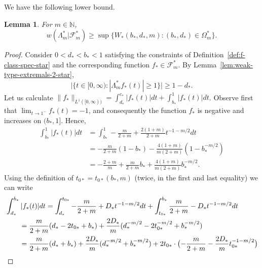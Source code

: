 \documentclass[a4paper]{amsart} %
\newtheorem{lemma}[theorem]{Lemma}
\theoremstyle{definition}
\theoremstyle{remark}
\numberwithin{equation}{section}
\newcommand*{\NNone}{\mathbb{N}}
\newcommand*{\weakconstrestricted}[2]{w(#1|#2)} %
\newcommand*{\fclassspecStar}[1]{\mathcal{F}_{#1}^*}
\newcommand*{\fStar}{f_{*}}
\newcommand*{\bStar}{b_*}
\newcommand*{\cStar}{c_*}
\newcommand*{\dStar}{d_*}
\newcommand*{\dOneStar}{D_*}%
\newcommand*{\tZeroStar}{t_{0*}}
\newcommand*{\specialbdStar}[1]{\Omega_{#1}^*}
\newcommand*{\XXXspecialbdStar}{W_*}
\begin{document}
We have the following lower bound.


\begin{lemma}
    \label{lem:lower-bound-fixed-m-special-b-c-d-alternate-expression-with-inequality-star}
	For $m\in\NNone$,
	\begin{equation*}
	\weakconstrestricted{\Lambda_m^*}{\fclassspecStar{m}} 
	\geq 
	\sup\bigl\{
	\XXXspecialbdStar(\bStar,\dStar,m) : (\bStar,\dStar)\in\specialbdStar{m} \bigr\}.
	\end{equation*}
\end{lemma}




\begin{proof}
	Consider $0< \dStar < \bStar < 1$ satisfying the constraints of  Definition~\ref{def:f-class-spec-star}
	and the corresponding function  $\fStar\in\fclassspecStar{m}$. 
	By Lemma~\ref{lem:weak-type-extremals-2-star},
	\begin{equation*}
	\bigl|\{t\in[0,\infty) : |\Lambda_m^* \fStar(t)|\geq 1\} \bigr| 
	\geq  1 - \dStar.
	\end{equation*}
	Let us calculate 
		$\|\fStar\|_{L^1([0, \infty))} = \int_{\dStar}^{\cStar} |\fStar(t)| dt + \int_{\bStar}^1 |\fStar(t)| dt$.
		Observe first that $\lim_{t\to 1^-} \fStar(t) = -1 $,
		and consequently the function $\fStar$ is negative and increases on $(\bStar,1]$.
		Hence,
		\begin{align*}
		\int_{\bStar}^1 |\fStar(t)| dt &= \int_{\bStar}^1  - \frac{m}{2+m} +\frac{2(1+m)}{2+m} t^{-1-m/2} dt  \\
		&= - \frac{m}{2+m}(1-\bStar) - \frac{4(1+m)}{m(2+m)} (1-\bStar^{-m/2})\\
		&= -\frac{2+m}{m} + \frac{m}{2+m}\bStar + \frac{4(1+m)}{m(2+m)} \bStar^{-m/2}.
		\end{align*}
	Using the definition of $\tZeroStar  = \tZeroStar (\bStar,m)$ (twice, in the first and last equality) we can write 	
	\begin{align*}
	\MoveEqLeft[2]
	\int^{\bStar}_{\dStar} |\fStar(t)| dt
	= \int_{\dStar}^{\tZeroStar} -\frac{m}{2+m} + \dOneStar t^{-1-m/2}  dt 
	+  \int_{\tZeroStar}^{\bStar} \frac{m}{2+m} - \dOneStar t^{-1-m/2}  dt \\
	&= \frac{m}{2+m}(\dStar-2\tZeroStar+ \bStar) 
	+ \frac{2\dOneStar}{m} (\dStar^{-m/2} - 2 \tZeroStar^{-m/2} + \bStar^{-m/2}) \\
	&=  \frac{m}{2+m}(\dStar+ \bStar) + \frac{2\dOneStar}{m} (\dStar^{-m/2} + \bStar^{-m/2})
	+2\tZeroStar \cdot \bigl( -\frac{m}{2+m} -  \frac{2\dOneStar}{m} \tZeroStar^{-1-m/2} \bigr)  \\

\end{align*}
\end{proof}
\end{document}
